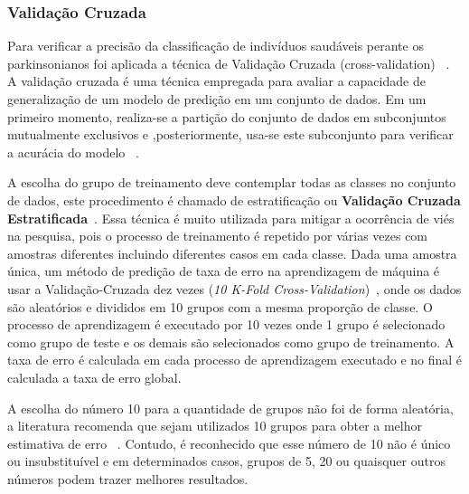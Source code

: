 \subsubsection{Validação Cruzada}\label{sec:validacao_cruzada_database}
Para verificar a precisão da classificação de indivíduos saudáveis perante os parkinsonianos foi aplicada a técnica de Validação Cruzada (cross-validation) ~\cite{datamining2005}. A validação cruzada é uma técnica empregada para avaliar a capacidade de generalização de um modelo de predição em um conjunto de dados. Em um primeiro momento, realiza-se a partição do conjunto de dados em subconjuntos mutualmente exclusivos e ,posteriormente, usa-se este subconjunto para verificar a acurácia do modelo ~\cite{datamining2005}. 

A escolha do grupo de treinamento deve contemplar todas as classes no conjunto de dados, este procedimento é chamado de estratificação ou \textbf{Validação Cruzada Estratificada}~\cite{datamining2005}. Essa técnica é muito utilizada para mitigar a ocorrência de viés na pesquisa, pois o processo de treinamento é repetido por várias vezes com amostras diferentes incluindo diferentes casos em cada classe. Dada uma amostra única, um método de predição de taxa de erro na aprendizagem de máquina é usar a Validação-Cruzada dez vezes (\textit{10 K-Fold Cross-Validation})~\cite{datamining2005}, onde os dados são aleatórios e divididos em 10 grupos com a mesma proporção de classe. O processo de aprendizagem é executado por 10 vezes onde 1 grupo é selecionado como grupo de teste e os demais são selecionados como grupo de treinamento. A taxa de erro é calculada em cada processo de aprendizagem executado e no final é calculada a taxa de erro global. 

A escolha do número 10 para a quantidade de grupos não foi de forma aleatória, a literatura recomenda que sejam utilizados 10 grupos para obter a melhor estimativa de erro ~\cite{datamining2005}. Contudo, é reconhecido que esse número de 10 não é único ou insubstituível e em determinados casos, grupos de 5, 20 ou quaisquer outros números podem trazer melhores resultados.


